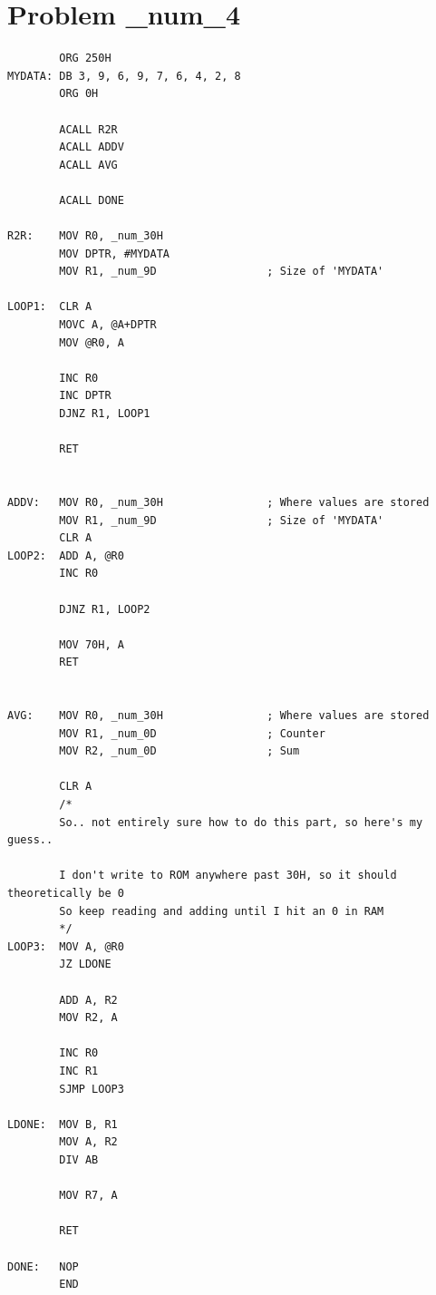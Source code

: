 \documentclass[12pt]{article}
\begin{document}
\section{Problem \_num_4}
\begin{verbatim}
        ORG 250H
MYDATA: DB 3, 9, 6, 9, 7, 6, 4, 2, 8
        ORG 0H

        ACALL R2R
        ACALL ADDV
        ACALL AVG

        ACALL DONE

R2R:    MOV R0, _num_30H
        MOV DPTR, #MYDATA
        MOV R1, _num_9D                 ; Size of 'MYDATA'

LOOP1:  CLR A
        MOVC A, @A+DPTR
        MOV @R0, A

        INC R0
        INC DPTR
        DJNZ R1, LOOP1

        RET


ADDV:   MOV R0, _num_30H                ; Where values are stored
        MOV R1, _num_9D                 ; Size of 'MYDATA'
        CLR A
LOOP2:  ADD A, @R0
        INC R0

        DJNZ R1, LOOP2

        MOV 70H, A
        RET


AVG:    MOV R0, _num_30H                ; Where values are stored
        MOV R1, _num_0D                 ; Counter
        MOV R2, _num_0D                 ; Sum

        CLR A
        /*
        So.. not entirely sure how to do this part, so here's my guess..

        I don't write to ROM anywhere past 30H, so it should theoretically be 0
        So keep reading and adding until I hit an 0 in RAM
        */
LOOP3:  MOV A, @R0
        JZ LDONE

        ADD A, R2
        MOV R2, A

        INC R0
        INC R1
        SJMP LOOP3

LDONE:  MOV B, R1
        MOV A, R2
        DIV AB

        MOV R7, A

        RET

DONE:   NOP
        END
\end{verbatim}
\end{document}
